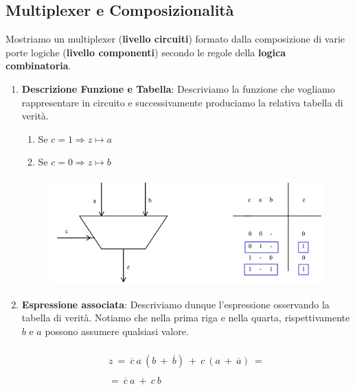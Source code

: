 \documentclass{article}
\begin{document}
\subsection{Multiplexer e Composizionalità}

Mostriamo un multiplexer (\textbf{livello circuiti}) formato dalla composizione di varie porte logiche (\textbf{livello componenti}) secondo le regole della \textbf{logica combinatoria}.

\begin{enumerate}

    \item \textbf{Descrizione Funzione e Tabella}: Descriviamo la funzione che vogliamo rappresentare in circuito e successivamente produciamo la relativa tabella di verità.

    \begin{enumerate}
        \item Se $c = 1 \Rightarrow z \mapsto a$
        \item Se $c = 0 \Rightarrow z \mapsto b$
    \end{enumerate}

    \begin{figure}[htbp]
        \center
        \includegraphics[scale=0.45]{img/multiplexer.png}
    \end{figure}

    \newpage
    
    \item \textbf{Espressione associata}: Descriviamo dunque l'espressione osservando la tabella di verità. Notiamo che nella prima riga e nella quarta, rispettivamente $b$ e $a$ possono assumere qualsiasi valore.

    \begin{multline}
        \\ z \: = \: \overline{c}\:a\:(b \: + \: \overline{b}) \: + \: c\:(a \: + \: \overline{a}) \: = \\
        \\ = \: \overline{c}\:a \: + \: c \: b \\
    \end{multline}


\end{enumerate}
\end{document}

